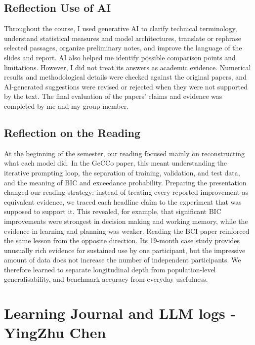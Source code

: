 \subsection{Reflection Use of AI}
Throughout the course, I used generative AI to clarify technical terminology, understand statistical measures and model architectures, translate or rephrase selected passages, organize preliminary notes, and improve the language of the slides and report. AI also helped me identify possible comparison points and limitations. However, I did not treat its answers as academic evidence. Numerical results and methodological details were checked against the original papers, and AI-generated suggestions were revised or rejected when they were not supported by the text. The final evaluation of the papers' claims and evidence was completed by me and my group member.
\subsection{Reflection on the Reading}
At the beginning of the semester, our reading focused mainly on reconstructing what each model did. In the GeCCo paper, this meant understanding the iterative prompting loop, the separation of training, validation, and test data, and the meaning of BIC and exceedance probability. Preparing the presentation changed our reading strategy: instead of treating every reported improvement as equivalent evidence, we traced each headline claim to the experiment that was supposed to support it. This revealed, for example, that significant BIC improvements were strongest in decision making and working memory, while the evidence in learning and planning was weaker. Reading the BCI paper reinforced the same lesson from the opposite direction. Its 19-month case study provides unusually rich evidence for sustained use by one participant, but the impressive amount of data does not increase the number of independent participants. We therefore learned to separate longitudinal depth from population-level generalisability, and benchmark accuracy from everyday usefulness.



 
\appendix
 
\section{Learning Journal and LLM logs - YingZhu Chen}
 
